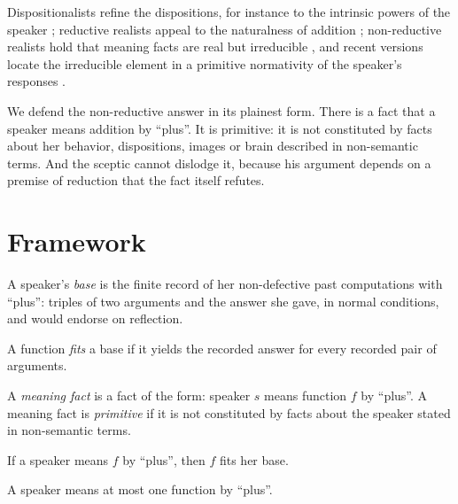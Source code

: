 \documentclass{situationist-preprint}
\begin{document}
Dispositionalists refine the dispositions, for instance to the intrinsic powers of the speaker \citep{MartinHeil1998}; reductive realists appeal to the naturalness of addition \citep{Lewis1983}; non-reductive realists hold that meaning facts are real but irreducible \citep{McGinn1984,Wright1984,Boghossian1989}, and recent versions locate the irreducible element in a primitive normativity of the speaker's responses \citep{Ginsborg2011}.

We defend the non-reductive answer in its plainest form. There is a fact that a speaker means addition by \enquote{plus}. It is primitive: it is not constituted by facts about her behavior, dispositions, images or brain described in non-semantic terms. And the sceptic cannot dislodge it, because his argument depends on a premise of reduction that the fact itself refutes.

\section{Framework}

\begin{definition}[Base]\label{d:base}
A speaker's \emph{base} is the finite record of her non-defective past computations with \enquote{plus}: triples of two arguments and the answer she gave, in normal conditions, and would endorse on reflection.
\end{definition}

\begin{definition}[Fit]\label{d:fit}
A function \emph{fits} a base if it yields the recorded answer for every recorded pair of arguments.
\end{definition}

\begin{definition}\label{d:mean}
A \emph{meaning fact} is a fact of the form: speaker $s$ means function $f$ by \enquote{plus}. A meaning fact is \emph{primitive} if it is not constituted by facts about the speaker stated in non-semantic terms.
\end{definition}

\begin{assumption}[Fit]\label{a:fit}
If a speaker means $f$ by \enquote{plus}, then $f$ fits her base.
\end{assumption}

\begin{assumption}[Determinacy]\label{a:det}
A speaker means at most one function by \enquote{plus}.
\end{assumption}
\end{document}
